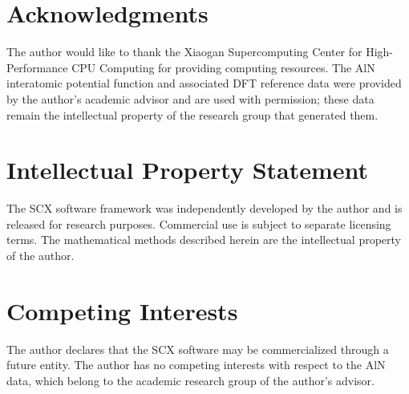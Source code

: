 \documentclass[twoside,prb,aps,floatfix,superscriptaddress,longbibliography]{revtex4-2}
\begin{document}
\section*{Acknowledgments}
The author would like to thank the Xiaogan Supercomputing Center for High-Performance CPU Computing for providing computing resources. The AlN interatomic potential function and associated DFT reference data were provided by the author's academic advisor and are used with permission; these data remain the intellectual property of the research group that generated them.

\section*{Intellectual Property Statement}
The SCX software framework was independently developed by the author and is released  for research purposes. Commercial use is subject to separate licensing terms. The mathematical methods described herein are the intellectual property of the author.

\section*{Competing Interests}
The author declares that the SCX software may be commercialized through a future entity. The author has no competing interests with respect to the AlN data, which belong to the academic research group of the author's advisor.
\end{document}
